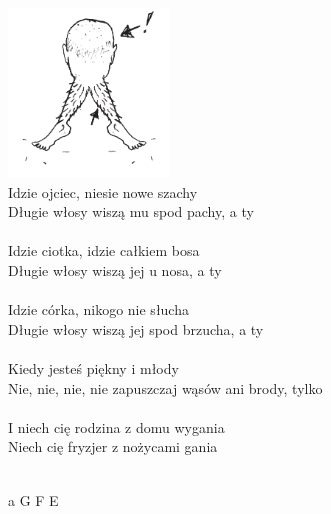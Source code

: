 \documentclass[a5paper, 10pt]{book}
\begin{document}
\begin{minipage}[t]{0.9\textwidth}
  \includegraphics[height=4.5cm, right]{wlosy2.png}\vspace*{-4.6cm}\\
  Idzie ojciec, niesie nowe szachy\\
  Długie włosy wiszą mu spod pachy, a ty\\
  \\
  Idzie ciotka, idzie całkiem bosa\\
  Długie włosy wiszą jej u nosa, a ty\\
  \\
  Idzie córka, nikogo nie słucha\\
  Długie włosy wiszą jej spod brzucha, a ty\\
  \\
  Kiedy jesteś piękny i młody\\
  Nie, nie, nie, nie zapuszczaj wąsów ani brody, tylko\\
  \\
  I niech cię rodzina z domu wygania\\
  Niech cię fryzjer z nożycami gania\\
  \\
\end{minipage}
\begin{minipage}[t]{0.1\textwidth}
  a G F E\\
\end{minipage}
\newpage
\end{document}
